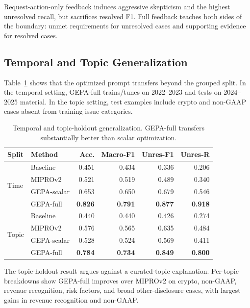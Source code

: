 \documentclass[11pt]{article}
\begin{document}
Request-action-only feedback induces aggressive skepticism and the highest unresolved recall, but sacrifices resolved F1. Full feedback teaches both sides of the boundary: unmet requirements for unresolved cases and supporting evidence for resolved cases.

\subsection{Temporal and Topic Generalization}

Table~\ref{tab:gen} shows that the optimized prompt transfers beyond the grouped split. In the temporal setting, GEPA-full trains/tunes on 2022--2023 and tests on 2024--2025 material. In the topic setting, test examples include crypto and non-GAAP cases absent from training issue categories.

\begin{table}[t]
\centering
\small
\begin{tabular}{llrrrr}
\toprule
\textbf{Split} & \textbf{Method} & \textbf{Acc.} & \textbf{Macro-F1} & \textbf{Unres-F1} & \textbf{Unres-R} \\
\midrule
\multirow{4}{*}{Time} 
& Baseline & 0.451 & 0.434 & 0.336 & 0.206 \\
& MIPROv2 & 0.521 & 0.519 & 0.489 & 0.340 \\
& GEPA-scalar & 0.653 & 0.650 & 0.679 & 0.546 \\
& GEPA-full & \textbf{0.826} & \textbf{0.791} & \textbf{0.877} & \textbf{0.918} \\
\midrule
\multirow{4}{*}{Topic}
& Baseline & 0.440 & 0.440 & 0.426 & 0.274 \\
& MIPROv2 & 0.576 & 0.565 & 0.635 & 0.484 \\
& GEPA-scalar & 0.528 & 0.524 & 0.569 & 0.411 \\
& GEPA-full & \textbf{0.784} & \textbf{0.734} & \textbf{0.849} & \textbf{0.800} \\
\bottomrule
\end{tabular}
\caption{Temporal and topic-holdout generalization. GEPA-full transfers substantially better than scalar optimization.}
\label{tab:gen}
\end{table}

The topic-holdout result argues against a curated-topic explanation. Per-topic breakdowns show GEPA-full improves over MIPROv2 on crypto, non-GAAP, revenue recognition, risk factors, and broad other-disclosure cases, with largest gains in revenue recognition and non-GAAP.
\end{document}
